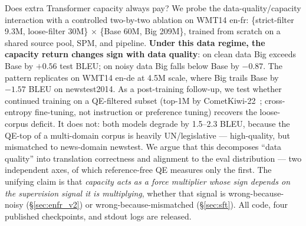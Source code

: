 Does extra Transformer capacity always pay? We probe the data-quality/capacity interaction with a controlled two-by-two ablation on WMT14 en-fr: \{strict-filter 9.3M, loose-filter 30M\} $\times$ \{Base 60M, Big 209M\}, trained from scratch on a shared source pool, SPM, and pipeline. \textbf{Under this data regime, the capacity return changes sign with data quality}: on clean data Big exceeds Base by $+0.56$ test BLEU; on noisy data Big falls below Base by $-0.87$. The pattern replicates on WMT14 en-de at 4.5M scale, where Big trails Base by $-1.57$ BLEU on newstest2014. As a post-training follow-up, we test whether continued training on a QE-filtered subset (top-1M by CometKiwi-22~\cite{rei2022cometkiwi}; cross-entropy fine-tuning, not instruction or preference tuning) recovers the loose-corpus deficit. It does not: both models degrade by 1.5--2.3 BLEU, because the QE-top of a multi-domain corpus is heavily UN/legislative --- high-quality, but mismatched to news-domain newstest. We argue that this decomposes ``data quality'' into translation correctness and alignment to the eval distribution --- two independent axes, of which reference-free QE measures only the first. The unifying claim is that \emph{capacity acts as a force multiplier whose sign depends on the supervision signal it is multiplying}, whether that signal is wrong-because-noisy (\S\ref{sec:enfr_v2}) or wrong-because-mismatched (\S\ref{sec:sft}). All code, four published checkpoints, and stdout logs are released.
